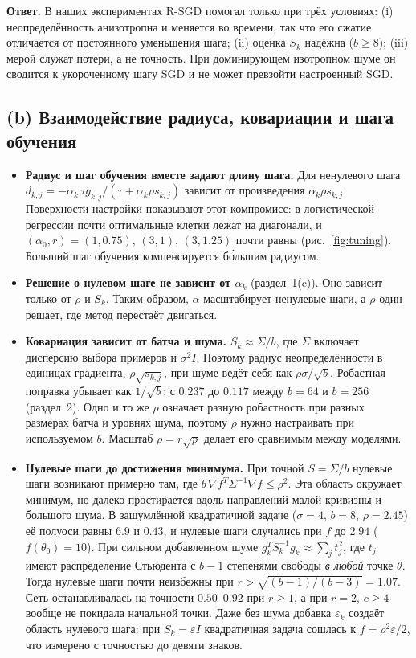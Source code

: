 \documentclass[11pt,a4paper]{article}
\begin{document}
\textbf{Ответ.} В наших экспериментах R-SGD помогал только при трёх условиях: (i) неопределённость
анизотропна и меняется во времени, так что его сжатие отличается от постоянного уменьшения шага;
(ii) оценка $S_k$ надёжна ($b\ge8$); (iii) мерой служат потери, а не точность. При доминирующем
изотропном шуме он сводится к укороченному шагу SGD и не может превзойти настроенный SGD.

\subsection{(b) Взаимодействие радиуса, ковариации и шага обучения}

\begin{itemize}
\item \textbf{Радиус и шаг обучения вместе задают длину шага.} Для ненулевого шага
$d_{k,j}=-\alpha_k\,\tau g_{k,j}/(\tau+\alpha_k\rho s_{k,j})$ зависит от произведения
$\alpha_k\rho s_{k,j}$. Поверхности настройки показывают этот компромисс: в логистической регрессии
почти оптимальные клетки лежат на диагонали, и $(\alpha_0,r)=(1,0.75)$, $(3,1)$, $(3,1.25)$ почти
равны (рис.~\ref{fig:tuning}). Больший шаг обучения компенсируется бо́льшим радиусом.
\item \textbf{Решение о нулевом шаге не зависит от $\alpha_k$} (раздел~1(c)). Оно зависит только от
$\rho$ и $S_k$. Таким образом, $\alpha$ масштабирует ненулевые шаги, а $\rho$ один решает, где метод
перестаёт двигаться.
\item \textbf{Ковариация зависит от батча и шума.} $S_k\approx\Sigma/b$, где $\Sigma$ включает
дисперсию выбора примеров и $\sigma^2I$. Поэтому радиус неопределённости в единицах градиента,
$\rho\sqrt{s_{k,j}}$, при шуме ведёт себя как $\rho\sigma/\sqrt b$. Робастная поправка убывает как
$1/\sqrt b$: с $0.237$ до $0.117$ между $b=64$ и $b=256$ (раздел~2). Одно и то же $\rho$ означает
разную робастность при разных размерах батча и уровнях шума, поэтому $\rho$ нужно настраивать при
используемом $b$. Масштаб $\rho=r\sqrt p$ делает его сравнимым между моделями.
\item \textbf{Нулевые шаги до достижения минимума.} При точной $S=\Sigma/b$ нулевые шаги возникают
примерно там, где $b\,\nabla f^T\Sigma^{-1}\nabla f\le\rho^2$. Эта область окружает минимум, но
далеко простирается вдоль направлений малой кривизны и большого шума. В зашумлённой квадратичной
задаче ($\sigma=4$, $b=8$, $\rho=2.45$) её полуоси равны $6.9$ и $0.43$, и нулевые шаги случались
при $f$ до $2.94$ ($f(\theta_0)=10$). При сильном добавленном шуме
$g_k^TS_k^{-1}g_k\approx\sum_jt_j^2$, где $t_j$ имеют распределение Стьюдента с $b-1$ степенями
свободы \emph{в любой} точке $\theta$. Тогда нулевые шаги почти неизбежны при
$r>\sqrt{(b-1)/(b-3)}=1.07$. Сеть останавливалась на точности $0.50$--$0.92$ при $r\ge1$, а при
$r=2$, $c\ge4$ вообще не покидала начальной точки. Даже без шума добавка $\varepsilon_k$ создаёт
область нулевого шага: при $S_k=\varepsilon I$ квадратичная задача сошлась к $f=\rho^2\varepsilon/2$,
что измерено с точностью до девяти знаков.
\end{itemize}
\end{document}
